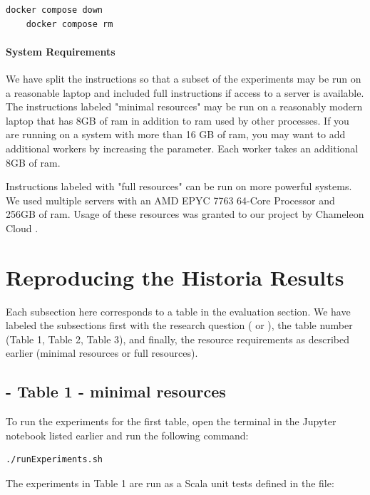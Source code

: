 \documentclass{acmart} %
\begin{document}
\begin{lstlisting}[language=bash]
    docker compose down
    docker compose rm
\end{lstlisting}

\paragraph{System Requirements} 
We have split the instructions so that a subset of the experiments may be run on a reasonable laptop and included full instructions if access to a server is available.
The instructions labeled "minimal resources" may be run on a reasonably modern laptop that has 8GB of ram in addition to ram used by other processes. If you are running on a system with more than 16 GB of ram, you may want to add additional workers by increasing the  parameter. Each worker takes an additional 8GB of ram.

Instructions labeled with "full resources" can be run on more powerful systems.  We used multiple servers with an AMD EPYC 7763 64-Core Processor and 256GB of ram.  Usage of these resources was granted to our project by Chameleon Cloud \cite{keahey2020lessons}.


\section{Reproducing the Historia Results}

Each subsection here corresponds to a table in the evaluation section.  We have labeled the subsections first with the research question ( or ), the table number (Table 1, Table 2, Table 3), and finally, the resource requirements as described earlier (minimal resources or full resources).

\subsection{ - Table 1 - minimal resources}

To run the experiments for the first table, open the terminal in the Jupyter notebook listed earlier and run the following command:
\begin{lstlisting}[language=bash]
    ./runExperiments.sh
\end{lstlisting}

The experiments in Table 1 are run as a Scala unit tests defined in the file: 
\end{document}
